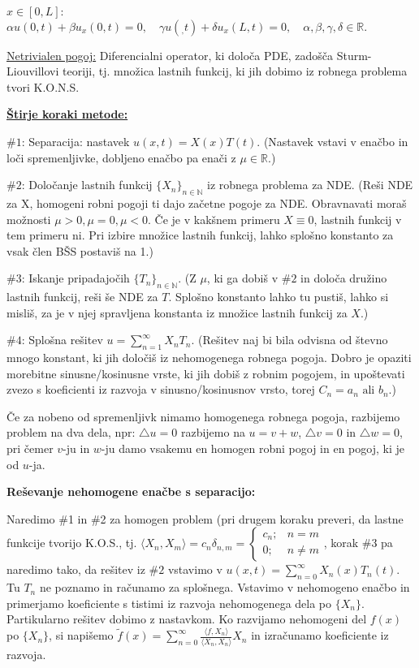 \documentclass[10pt,a4paper]{amsart}
\theoremstyle{definition} %
\theoremstyle{plain} %
\newcommand{\R}{\mathbb R}
\newcommand{\N}{\mathbb N}
\begin{document}
$x \in [0,L]$: $\alpha u(0,t) + \beta u_x(0,t) = 0, \quad \gamma u(_,t)+\delta
u_x(L,t) = 0, \quad \alpha, \beta, \gamma, \delta \in \R.$

\underline{Netrivialen pogoj:} Diferencialni operator, ki določa PDE, zadošča
Sturm-Liouvillovi teoriji, tj. množica lastnih funkcij, ki jih dobimo iz robnega
problema tvori K.O.N.S.


\underline{\textbf{Štirje koraki metode:}}

$\#1$: Separacija: nastavek $u(x,t)=X(x)T(t)$. (Nastavek vstavi v enačbo in loči
spremenljivke, dobljeno enačbo pa enači z $\mu \in \R$.)

$\#2$: Določanje lastnih funkcij $\{X_n\}_{n\in \N}$ iz robnega problema za NDE.
(Reši NDE za X, homogeni robni pogoji ti dajo začetne pogoje za NDE. Obravnavati
moraš možnosti $\mu >0, \mu = 0, \mu < 0$. Če je v kakšnem primeru $X \equiv 0$,
lastnih funkcij v tem primeru ni. Pri izbire množice lastnih funkcij, lahko
splošno konstanto za vsak člen BŠS postaviš na 1.)

$\#3$: Iskanje pripadajočih $\{T_n \}_{n \in \N}$. (Z $\mu$, ki ga dobiš v $\#2$
in določa družino lastnih funkcij, reši še NDE za $T$. Splošno konstanto lahko
tu pustiš, lahko si misliš, za je v njej spravljena konstanta iz množice lastnih
funkcij za $X$.)

$\#4$: Splošna rešitev $u = \sum_{n=1}^\infty X_nT_n$. (Rešitev naj bi bila
odvisna od števno mnogo konstant, ki jih določiš iz nehomogenega robnega pogoja.
Dobro je opaziti morebitne sinusne/kosinusne vrste, ki jih dobiš z robnim
pogojem, in upoštevati zvezo s koeficienti iz razvoja v sinusno/kosinusnov
vrsto, torej $C_n = a_n \text{ ali } b_n$.)

Če za nobeno od spremenljivk nimamo homogenega robnega pogoja, razbijemo problem
na dva dela, npr: $\triangle u = 0$ razbijemo na $u = v+w$, $\triangle v = 0$ in
$\triangle w = 0$, pri čemer $v$-ju in $w$-ju damo vsakemu en homogen robni
pogoj in en pogoj, ki je od $u$-ja.

\textbf{Reševanje nehomogene enačbe s separacijo:}

Naredimo $\#$1 in $\#$2 za homogen problem (pri drugem koraku preveri, da lastne funkcije tvorijo K.O.S., tj. $\langle X_n,X_m \rangle = c_n \delta_{n,m} = \begin{cases} c_n; & n = m \\ 0; & n \neq m \end{cases}$, korak $\#$3 pa naredimo tako, da rešitev iz $\#2$ vstavimo v $u(x,t) = \sum_{n=0}^\infty X_n(x)T_n(t)$. Tu $T_n$ ne poznamo in računamo za splošnega. Vstavimo v nehomogeno enačbo in primerjamo koeficiente s tistimi iz razvoja nehomogenega dela po $\{X_n\}$. Partikularno rešitev dobimo z nastavkom. Ko razvijamo nehomogeni del $f(x)$ po $\{X_n\}$, si napišemo $\tilde{f}(x) = \sum_{n=0}^\infty \frac{\langle f,X_n \rangle}{\langle X_n,X_n \rangle}X_n$ in izračunamo koeficiente iz razvoja.
\end{document}
